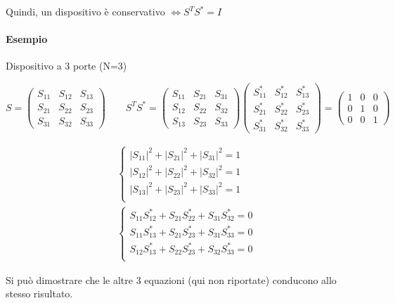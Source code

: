 Quindi, un dispositivo è conservativo $\Leftrightarrow S^TS^*=I$

\paragraph{Esempio} Dispositivo a 3 porte (N=3)

\[
S = \left(\begin{array}{ccc}
S_{11}&S_{12}&S_{13}\\
S_{21}&S_{22}&S_{23}\\
S_{31}&S_{32}&S_{33}
\end{array}\right)
\qquad
S^TS^* = \left(\begin{array}{ccc}
S_{11}&S_{21}&S_{31}\\
S_{12}&S_{22}&S_{32}\\
S_{13}&S_{23}&S_{33}
\end{array}\right)
\left(\begin{array}{ccc}
S_{11}^*&S_{12}^*&S_{13}^*\\
S_{21}^*&S_{22}^*&S_{23}^*\\
S_{31}^*&S_{32}^*&S_{33}^*
\end{array}\right)
=
\left(\begin{array}{ccc}
1&0&0\\
0&1&0\\
0&0&1
\end{array}\right)
\]

\begin{align}
&\begin{cases}
|S_{11}|^2 + |S_{21}|^2 + |S_{31}|^2 = 1\\
|S_{12}|^2 + |S_{22}|^2 + |S_{32}|^2 = 1\\
|S_{13}|^2 + |S_{23}|^2 + |S_{33}|^2 = 1\\
\end{cases}
\label{eq:conservativo1}
\\
&\begin{cases}
S_{11}S_{12}^* + S_{21}S_{22}^* + S_{31}S_{32}^*=0\\
S_{11}S_{13}^* + S_{21}S_{23}^* + S_{31}S_{33}^*=0\\
S_{12}S_{13}^* + S_{22}S_{23}^* + S_{32}S_{33}^*=0\\
\end{cases}
\label{eq:conservativo2}
\end{align}

Si può dimostrare che le altre 3 equazioni (qui non riportate) conducono allo stesso risultato.

